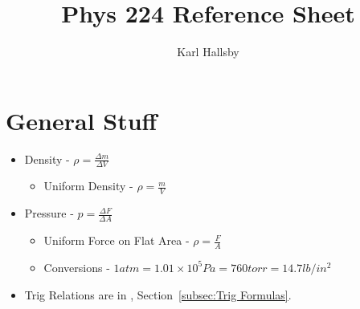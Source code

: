 \documentclass[10pt,letterpaper,final,twoside,notitlepage]{article}
\author{Karl Hallsby}
\title{Phys 224 Reference Sheet}
\numberwithin{equation}{section} %
\theoremstyle{definition}
\theoremstyle{remark}
\begin{document}
	\tableofcontents
	\newpage
	
\section{General Stuff} \label{sec:General}
	\begin{itemize}[noitemsep]
		\item Density - $\rho = \frac{\Delta m}{\Delta V}$
			\begin{itemize}
				\item Uniform Density - $\rho = \frac{m}{V}$
			\end{itemize}
		
		\item Pressure - $p = \frac{\Delta F}{\Delta A}$
			\begin{itemize}
				\item Uniform Force on Flat Area - $\rho = \frac{F}{A}$
				\item Conversions - $1 atm = 1.01 \times 10^5 Pa = 760 torr = 14.7 lb/in^2$
			\end{itemize}
		\item Trig Relations are in , Section~\ref{subsec:Trig Formulas}.
	\end{itemize}















\appendix
{}

\clearpage


\clearpage


\clearpage

\end{document}
